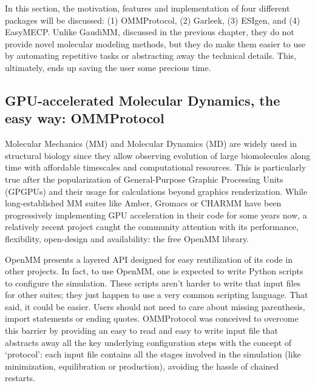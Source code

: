 In this section, the motivation, features and implementation of four different packages will be discussed: (1) OMMProtocol, (2) Garleek, (3) ESIgen, and (4) EasyMECP. Unlike GaudiMM, discussed in the previous chapter, they do not provide novel molecular modeling methods, but they do make them easier to use by automating repetitive tasks or abstracting away the technical details. This, ultimately, ends up saving the user some precious time.

\subsection{GPU-accelerated Molecular Dynamics, the easy way: OMMProtocol}




Molecular Mechanics (MM) and Molecular Dynamics (MD) are widely used in structural biology since they allow observing evolution of large biomolecules along time with affordable timescales and computational resources. This is particularly true after the popularization of General-Purpose Graphic Processing Units (GPGPUs) and their usage for calculations beyond graphics renderization. While long-established MM suites like Amber,\cite{amber} Gromacs\cite{gromacs} or CHARMM\cite{brooks1983} have been progressively implementing GPU acceleration in their code for some years now, a relatively recent project caught the community attention with its performance, flexibility, open-design and availability: the free OpenMM library.\cite{openmm}

OpenMM presents a layered API designed for easy reutilization of its code in other projects. In fact, to use OpenMM, one is expected to write Python scripts to configure the simulation. These scripts aren’t harder to write that input files for other suites; they just happen to use a very common scripting language. That said, it could be easier. Users should not need to care about missing parenthesis, import statements or ending quotes. OMMProtocol was conceived to overcome this barrier by providing an easy to read and easy to write input file that abstracts away all the key underlying configuration steps with the concept of ‘protocol’: each input file contains all the stages involved in the simulation (like minimization, equilibration or production), avoiding the hassle of chained restarts.

